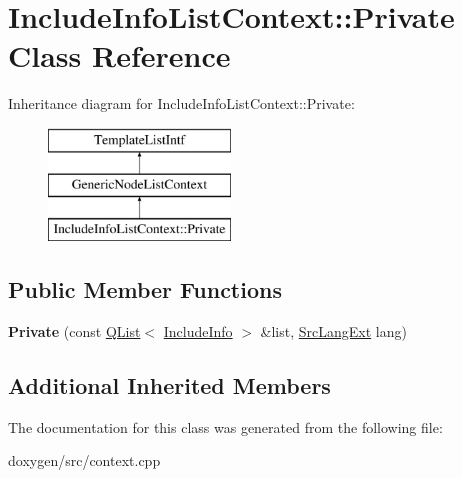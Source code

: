 \hypertarget{class_include_info_list_context_1_1_private}{}\section{Include\+Info\+List\+Context\+::Private Class Reference}
\label{class_include_info_list_context_1_1_private}
Inheritance diagram for Include\+Info\+List\+Context\+::Private\+:\begin{figure}[H]
\begin{center}
\leavevmode
\includegraphics[height=3.000000cm]{class_include_info_list_context_1_1_private}
\end{center}
\end{figure}
\subsection*{Public Member Functions}
\begin{DoxyCompactItemize}
\item 
\mbox{\label{class_include_info_list_context_1_1_private_a5d1c4cd764021833d41fe06fd280fc04}} 
{\bfseries Private} (const \mbox{\hyperlink{class_q_list}{Q\+List}}$<$ \mbox{\hyperlink{struct_include_info}{Include\+Info}} $>$ \&list, \mbox{\hyperlink{types_8h_a9974623ce72fc23df5d64426b9178bf2}{Src\+Lang\+Ext}} lang)
\end{DoxyCompactItemize}
\subsection*{Additional Inherited Members}


The documentation for this class was generated from the following file\+:\begin{DoxyCompactItemize}
\item 
doxygen/src/context.\+cpp\end{DoxyCompactItemize}

